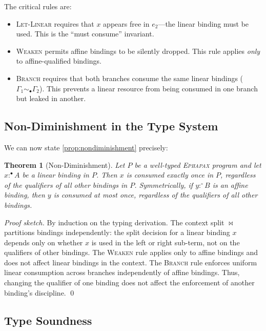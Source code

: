 \documentclass[11pt,a4paper]{article}
\newtheorem{theorem}{Theorem}[section]
\newcommand{\Ephapax}{\textsc{Ephapax}}
\newcommand{\lmark}{\bullet}  %
\newcommand{\amark}{\circ}    %
\newcommand{\ctx}{\Gamma}
\begin{document}
The critical rules are:

\begin{itemize}
  \item \textsc{Let-Linear} requires that $x$ appears free in $e_2$---the linear
    binding must be used. This is the ``must consume'' invariant.
  \item \textsc{Weaken} permits affine bindings to be silently dropped. This rule
    applies \emph{only} to affine-qualified bindings.
  \item \textsc{Branch} requires that both branches consume the same linear
    bindings ($\ctx_1 \sim_\lmark \ctx_2$). This prevents a linear resource
    from being consumed in one branch but leaked in another.
\end{itemize}

\subsection{Non-Diminishment in the Type System}

We can now state \ref{prop:nondiminishment} precisely:

\begin{theorem}[Non-Diminishment]
\label{thm:nondiminishment}
Let $P$ be a well-typed \Ephapax{} program and let $x :^\lmark A$ be a linear
binding in $P$. Then $x$ is consumed exactly once in $P$, regardless of the
qualifiers of all other bindings in $P$. Symmetrically, if $y :^\amark B$ is
an affine binding, then $y$ is consumed at most once, regardless of the
qualifiers of all other bindings.
\end{theorem}

\begin{proof}[Proof sketch]
By induction on the typing derivation. The context split $\bowtie$ partitions
bindings independently: the split decision for a linear binding $x$ depends only
on whether $x$ is used in the left or right sub-term, not on the qualifiers of
other bindings. The \textsc{Weaken} rule applies only to affine bindings and
does not affect linear bindings in the context. The \textsc{Branch} rule
enforces uniform linear consumption across branches independently of affine
bindings. Thus, changing the qualifier of one binding does not affect the
enforcement of another binding's discipline. \qed
\end{proof}

\subsection{Type Soundness}
\end{document}
